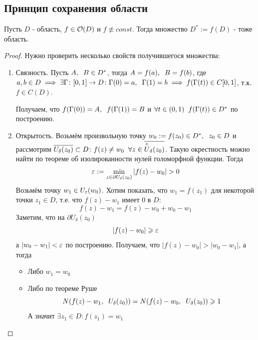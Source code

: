 \subsection{Принцип сохранения области}
\begin{theorem}
  Пусть $D$ - область, $f\in\mathcal{O}(D)$ и $f\not\equiv const$. Тогда множество $D^*:= f(D)$ - тоже область.
\end{theorem}
\begin{proof}
 Нужно проверить несколько свойств получившегося множества:
  \begin{enumerate}
    \item Связность. Пусть $A,\hspace{0.2cm} B\in D^*$, тогда $A=f(a),\hspace{0.2cm} B=f(b)$, где $a,b\in D\implies \exists \Gamma\colon [0,1]\to D\colon \Gamma(0)=a,\hspace{0.2cm} \Gamma(1)=b\implies f(\Gamma(t))\in C[0,1]$, т.к. $f\in C(D)$.

    Получаем, что $f(\Gamma(0)) = A,\hspace{0.2cm} f(\Gamma(1)) = B$ и $\forall t\in(0,1)\hspace{0.2cm} f(\Gamma(t))\in D^*$ по построению.  
    \item Открытость. Возьмём произвольную точку $w_0:=f(z_0)\in D^*,\hspace{0.2cm} z_0\in D$ и рассмотрим $\overline{U_\delta(z_0)}\subset D\colon f(z)\neq w_0\hspace{0.2cm}\forall z\in \overline{\overset{\circ}{U}_\delta(z_0)}$. Такую окрестность можно найти по теореме об изолированности нулей голоморфной функции. Тогда
    \[\e:=\min\limits_{z\in\partial U_\delta(z_0)}|f(z)-w_0|>0\]
    Возьмём точку $w_1\in U_\varepsilon(w_0)$. Хотим показать, что $w_1=f(z_1)$ для некоторой точки $z_1\in D$, т.е. что $f(z)-w_1$ имеет 0 в $D$:
    \[f(z)-w_1 = f(z) - w_0 + w_0 - w_1\]
    Заметим, что на $\partial U_\delta(z_0)$
    \[|f(z)-w_0| \geqslant \varepsilon\]
    а $|w_0-w_1|<\varepsilon$ по построению. Получаем, что $|f(z)-w_0|>|w_0-w_1|$, а тогда
    \begin{itemize}
      \item Либо $w_1 = w_0$
      \item Либо по теореме Руше
      \[N(f(z)-w_1,\hspace{0.2cm} U_\delta(z_0)) = N(f(z)-w_0,\hspace{0.2cm} U_\delta(z_0))\geqslant 1\]
      А значит $\exists z_1\in D\colon f(z_1) = w_1$
    \end{itemize}
  \end{enumerate}
\end{proof}
